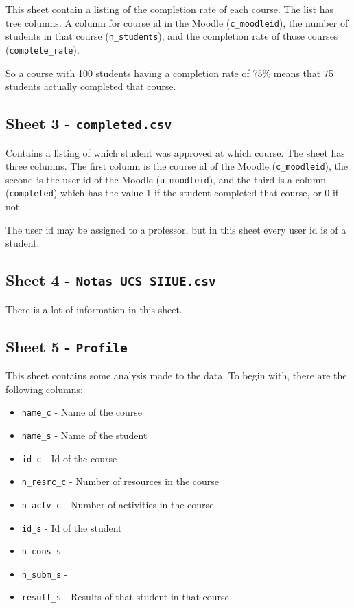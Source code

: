 This sheet contain a listing of the completion rate of each course. The list
has tree columns. A column for course id in the Moodle (\texttt{c\_moodleid}),
the number of students in that course (\texttt{n\_students}), and the
completion rate of those courses (\texttt{complete\_rate}).

So a course with 100 students having a completion rate of 75\% means that 75
students actually completed that course.

\subsection{Sheet 3 - \texttt{completed.csv}}

Contains a listing of which student was approved at which course. The sheet has
three columns. The first column is the course id of the Moodle
(\texttt{c\_moodleid}), the second is the user id of the Moodle
(\texttt{u\_moodleid}), and the third is a column (\texttt{completed}) which
has the value 1 if the student completed that course, or 0 if not.

The user id may be assigned to a professor, but in this sheet every user id is
of a student.

\subsection{Sheet 4 - \texttt{Notas UCS SIIUE.csv}}

There is a lot of information in this sheet.


\subsection{Sheet 5 - \texttt{Profile}}

This sheet contains some analysis made to the data. To begin with, there are
the following columns:

\begin{itemize}
    \item \texttt{name\_c} - Name of the course
    \item \texttt{name\_s} - Name of the student
    \item \texttt{id\_c} - Id of the course
    \item \texttt{n\_resrc\_c} - Number of resources in the course
    \item \texttt{n\_actv\_c} - Number of activities in the course
    \item \texttt{id\_s} - Id of the student
    \item \texttt{n\_cons\_s} - \TODO{}
    \item \texttt{n\_subm\_s} - \TODO{}
    \item \texttt{result\_s} - Results of that student in that course
\end{itemize}

